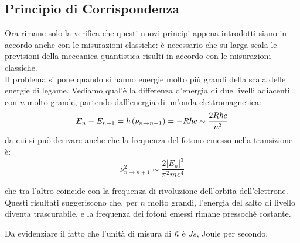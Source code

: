 \subsection{Principio di Corrispondenza}
Ora rimane solo la verifica che questi nuovi principi appena introdotti siano in accordo anche con le misurazioni classiche: è necessario che su larga scala le previsioni della meccanica quantistica risulti in accordo con le misurazioni classiche.\\
Il problema si pone quando si hanno energie molto più grandi della scala delle energie di legame. Vediamo qual'è la differenza d'energia di due livelli adiacenti con $n$ molto grande, partendo dall'energia di un'onda elettromagnetica:
\[
	E_n - E_{n-1} = \hslash \left(\nu_{n \rightarrow n-1}\right) = -R\hslash c\sim \frac{2R\hslash c}{n^3}
\]
da cui si può derivare anche che la frequenza del fotono emesso nella transizione è:
\[
	\nu_{n \rightarrow n+1}^2 \sim \frac{2|E_n|^3}{\pi^2 m e^4}
\]

che tra l'altro coincide con la frequenza di rivoluzione dell'orbita dell'elettrone.\\
Questi risultati suggeriscono che, per $n$ molto grandi, l'energia del salto di livello diventa trascurabile, e la frequenza dei fotoni emessi rimane pressoché costante.
\tab

Da evidenziare il fatto che l'unità di misura di $\hslash$ è $Js$, Joule per secondo.